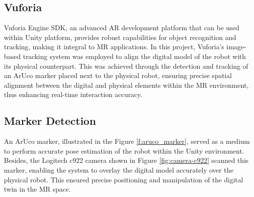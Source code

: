 \subsection{Vuforia}
\label{section:marker-detection}

Vuforia Engine \ac{SDK}, an advanced \ac{AR} development platform that can be used within Unity platform, provides robust capabilities for object recognition and tracking, making it integral to \ac{MR} applications. In this project, Vuforia's image-based tracking system was employed to align the digital model of the robot with its physical counterpart. This was achieved through the detection and tracking of an ArUco marker placed next to the physical robot, ensuring precise spatial alignment between the digital and physical elements within the \ac{MR} environment, thus enhancing real-time interaction accuracy.




\subsection{Marker Detection}

An ArUco marker, illustrated in the Figure \ref{f:aruco_marker}, served as a medium to perform accurate pose estimation of the robot within the Unity environment. Besides, the Logitech c922 camera shown in Figure \ref{fig:camera-c922} scanned this marker, enabling the system to overlay the digital model accurately over the physical robot. This ensured precise positioning and manipulation of the digital twin in the \ac{MR} space.

